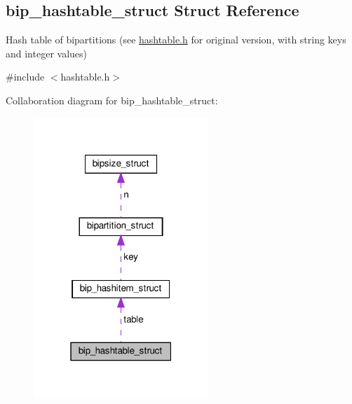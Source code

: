 \hypertarget{structbip__hashtable__struct}{}\subsection{bip\+\_\+hashtable\+\_\+struct Struct Reference}
\label{structbip__hashtable__struct}


Hash table of bipartitions (see \hyperlink{structhashtable__struct_ae77d63df7a927e68de61d431d5bc0ddc}{hashtable.\+h} for original version, with string keys and integer values)  




{\ttfamily \#include $<$hashtable.\+h$>$}



Collaboration diagram for bip\+\_\+hashtable\+\_\+struct\+:\nopagebreak
\begin{figure}[H]
\begin{center}
\leavevmode
\includegraphics[width=187pt]{structbip__hashtable__struct__coll__graph}
\end{center}
\end{figure}

